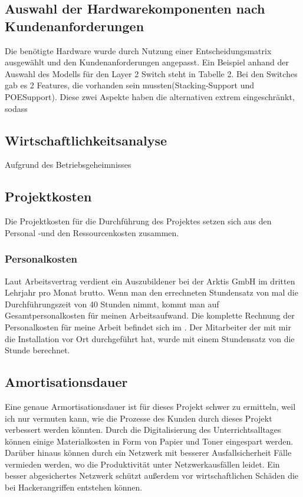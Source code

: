 \subsection{Auswahl der Hardwarekomponenten nach Kundenanforderungen}
\label{app:Auswahl der Hardwarekomponenten nach Kundenanforderungen}
Die benötigte Hardware wurde durch Nutzung einer Entscheidungsmatrix ausgewählt und den Kundenanforderungen angepasst. Ein Beispiel anhand der Auswahl des Modells für den Layer 2 Switch steht in Tabelle 2. Bei den Switches gab es 2 Features, die vorhanden sein mussten(Stacking-Support und \ac{POE}Support). Diese zwei Aspekte haben die alternativen extrem eingeschränkt, sodass 

\subsection{Wirtschaftlichkeitsanalyse}
\label{sec:Wirtschaftlichkeitsanalyse}
Aufgrund des Betriebsgeheimnisses 

\subsection{Projektkosten}
\label{sec:Projektkosten}
Die Projektkosten für die Durchführung des Projektes setzen sich aus den Personal -und den Ressourcenkosten zusammen.
\subsubsection{Personalkosten}
Laut Arbeitsvertrag verdient ein Auszubildener bei der Arktis GmbH im dritten Lehrjahr pro Monat  brutto. 
Wenn man den errechneten Stundensatz von  mal die Durchführungszeit von 40 Stunden nimmt, kommt man auf  Gesamtpersonalkosten für meinen Arbeitsaufwand. Die komplette Rechnung der Personalkosten für meine Arbeit befindet sich im . 
Der Mitarbeiter der mit mir die Installation vor Ort durchgeführt hat, wurde mit einem Stundensatz von  die Stunde berechnet.  

\subsection{Amortisationsdauer}
\label{sec:Amortisationsdauer}
Eine genaue Armortisationsdauer ist für dieses Projekt schwer zu ermitteln, weil ich nur vermuten kann, wie die Prozesse des Kunden durch dieses Projekt verbessert werden könnten. Durch die Digitalisierung des Unterrichtsalltages können einige Materialkosten in Form von Papier und Toner eingespart werden. Darüber hinaus können durch ein Netzwerk mit besserer Ausfallsicherheit Fälle vermieden werden, wo die Produktivität unter Netzwerkausfällen leidet. Ein besser abgesichertes Netzwerk schützt außerdem vor wirtschaftlichen Schäden die bei Hackerangriffen entstehen können. 

